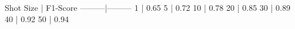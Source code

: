 Shot Size | F1-Score
---------|---------
    1    |   0.65
    5    |   0.72
   10    |   0.78
   20    |   0.85
   30    |   0.89
   40    |   0.92
   50    |   0.94